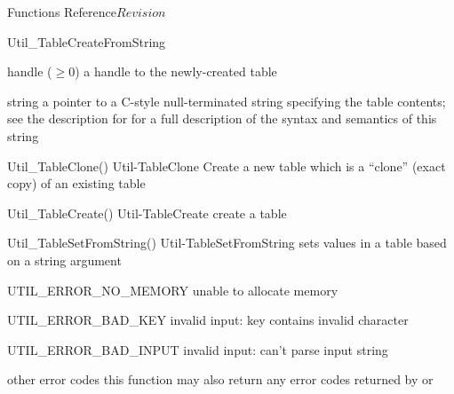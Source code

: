\begin{cactuspart}{ Functions Reference}{}{$Revision$}
\begin{FunctionDescription}{Util\_TableCreateFromString}
\begin{ResultSection}
\begin{Result}{handle ($\ge 0$)}
a handle to the newly-created table
\end{Result}
\end{ResultSection}

\begin{ParameterSection}
\begin{Parameter}{string}
a pointer to a C-style null-terminated string specifying the table
contents; see the description for 
for a full description of the syntax and semantics of this string
\end{Parameter}
\end{ParameterSection}

\begin{SeeAlsoSection}
\begin{SeeAlso2} {Util\_TableClone()} {Util-TableClone}
Create a new table which is a ``clone'' (exact copy) of an existing
table
\end{SeeAlso2}
\begin{SeeAlso2} {Util\_TableCreate()} {Util-TableCreate}
create a table
\end{SeeAlso2}
\begin{SeeAlso2} {Util\_TableSetFromString()} {Util-TableSetFromString}
sets values in a table based on a string argument
\end{SeeAlso2}
\end{SeeAlsoSection}

\begin{ErrorSection}
\begin{Error}{UTIL\_ERROR\_NO\_MEMORY}
unable to allocate memory
\end{Error}
\begin{Error}{UTIL\_ERROR\_BAD\_KEY}
invalid input: key contains invalid character
\end{Error}
\begin{Error}{UTIL\_ERROR\_BAD\_INPUT}
invalid input: can't parse input string
\end{Error}
\begin{Error}{\rm other error codes}
this function may also return any error codes returned by
 or 
\end{Error}
\end{ErrorSection}


\end{FunctionDescription}
\end{cactuspart}
